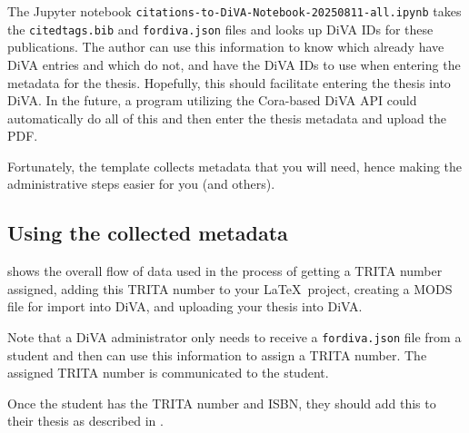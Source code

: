 \documentclass[12pt, twoside]{article}
\newcommand{\fname}[1]{\texttt{#1}}
\begin{document}
\begin{enumerate}
    The Jupyter notebook \fname{citations-to-DiVA-Notebook-20250811-all.ipynb} takes the \fname{citedtags.bib} and \fname{fordiva.json} files and looks up DiVA IDs for these publications. The author can use this information to \first know which already have DiVA entries and which do not, and \Second have the DiVA IDs to use when entering the metadata for the thesis. Hopefully, this should facilitate entering the thesis into \gls{DiVA}. In the future, a program utilizing the Cora-based DiVA API could automatically do all of this and then enter the thesis metadata and upload the PDF.
\end{enumerate}

Fortunately, the template collects metadata that you will need, hence making the administrative steps easier for you (and others). 

\subsection{Using the collected metadata}
 shows the overall flow of data used in the process of getting a TRITA number assigned, adding this TRITA number to your \LaTeX\ project, creating a \gls{MODS} file for import into \gls{DiVA}, and uploading your thesis into \gls{DiVA}. 

Note that a \gls{DiVA} administrator only needs to receive a \fname{fordiva.json} file from a student and then can use this information to assign a TRITA number. The assigned TRITA number is communicated to the student.

Once the student has the TRITA number and \gls{ISBN}, they should add this to their thesis as described in .

\end{document}
